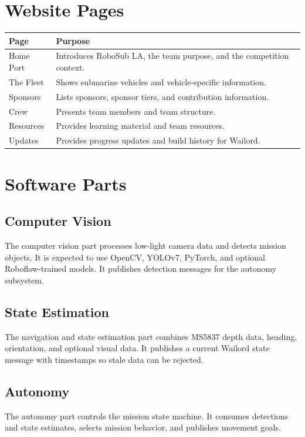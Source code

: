 \documentclass[12pt]{article}
\begin{document}
\section{Website Pages}
\begin{longtable}{|p{}|p{}|}
\hline
\textbf{Page} & \textbf{Purpose} \\
\hline
Home Port & Introduces RoboSub LA, the team purpose, and the competition context. \\
\hline
The Fleet & Shows submarine vehicles and vehicle-specific information. \\
\hline
Sponsors & Lists sponsors, sponsor tiers, and contribution information. \\
\hline
Crew & Presents team members and team structure. \\
\hline
Resources & Provides learning material and team resources. \\
\hline
Updates & Provides progress updates and build history for Wailord. \\
\hline
\end{longtable}

\section{Software Parts}
\subsection{Computer Vision}
The computer vision part processes low-light camera data and detects mission objects. It is expected to use OpenCV, YOLOv7, PyTorch, and optional Roboflow-trained models. It publishes detection messages for the autonomy subsystem.

\subsection{State Estimation}
The navigation and state estimation part combines MS5837 depth data, heading, orientation, and optional visual data. It publishes a current Wailord state message with timestamps so stale data can be rejected.

\subsection{Autonomy}
The autonomy part controls the mission state machine. It consumes detections and state estimates, selects mission behavior, and publishes movement goals.
\end{document}
